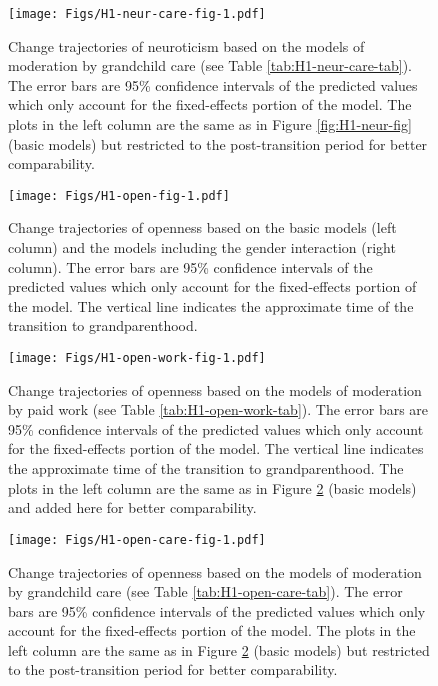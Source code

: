 \documentclass[
  english,
  man, noextraspace]{apa7}
\begin{document}
\begin{appendix}
\begin{figure}
\centering
\texttt{[image: Figs/H1-neur-care-fig-1.pdf]}
\caption{\label{fig:H1-neur-care-fig}Change trajectories of neuroticism based on
the models of moderation by grandchild care (see Table
\ref{tab:H1-neur-care-tab}). The error bars are 95\% confidence
intervals of the predicted values which only account for the
fixed-effects portion of the model. The plots in the left column are the
same as in Figure \ref{fig:H1-neur-fig} (basic models) but restricted to
the post-transition period for better comparability.}
\end{figure}








\begin{figure}
\centering
\texttt{[image: Figs/H1-open-fig-1.pdf]}
\caption{\label{fig:H1-open-fig}Change trajectories of openness based on the basic
models (left column) and the models including the gender interaction
(right column). The error bars are 95\% confidence intervals of the
predicted values which only account for the fixed-effects portion of the
model. The vertical line indicates the approximate time of the
transition to grandparenthood.}
\end{figure}










\begin{figure}
\centering
\texttt{[image: Figs/H1-open-work-fig-1.pdf]}
\caption{\label{fig:H1-open-work-fig}Change trajectories of openness based on the
models of moderation by paid work (see Table
\ref{tab:H1-open-work-tab}). The error bars are 95\% confidence
intervals of the predicted values which only account for the
fixed-effects portion of the model. The vertical line indicates the
approximate time of the transition to grandparenthood. The plots in the
left column are the same as in Figure \ref{fig:H1-open-fig} (basic
models) and added here for better comparability.}
\end{figure}









\begin{figure}
\centering
\texttt{[image: Figs/H1-open-care-fig-1.pdf]}
\caption{\label{fig:H1-open-care-fig}Change trajectories of openness based on the
models of moderation by grandchild care (see Table
\ref{tab:H1-open-care-tab}). The error bars are 95\% confidence
intervals of the predicted values which only account for the
fixed-effects portion of the model. The plots in the left column are the
same as in Figure \ref{fig:H1-open-fig} (basic models) but restricted to
the post-transition period for better comparability.}
\end{figure}









\end{appendix}
\end{document}
